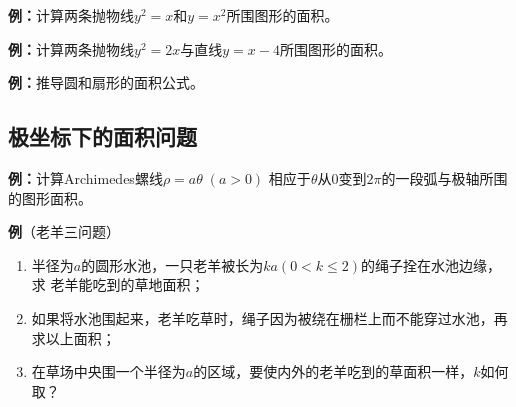 {\bf 例：}计算两条抛物线$y^2=x$和$y=x^2$所围图形的面积。

{\bf 例：}计算两条抛物线$y^2=2x$与直线$y=x-4$所围图形的面积。

{\bf 例：}推导圆和扇形的面积公式。

\subsection{极坐标下的面积问题}

{\bf 例：}计算Archimedes螺线$\rho=a\theta\;(a>0)$
相应于$\theta$从$0$变到$2\pi$的一段弧与极轴所围的图形面积。

\begin{center}
\end{center}

{\bf 例}（老羊三问题）
\begin{enumerate}[(1)]
  \setlength{\itemindent}{1cm}
  \item 半径为$a$的圆形水池，一只老羊被长为$ka(0<k\leq2)$的绳子拴在水池边缘，求
  老羊能吃到的草地面积；
  \item 如果将水池围起来，老羊吃草时，绳子因为被绕在栅栏上而不能穿过水池，再求以上面积；
  \item 在草场中央围一个半径为$a$的区域，要使内外的老羊吃到的草面积一样，$k$如何取？
\end{enumerate}

